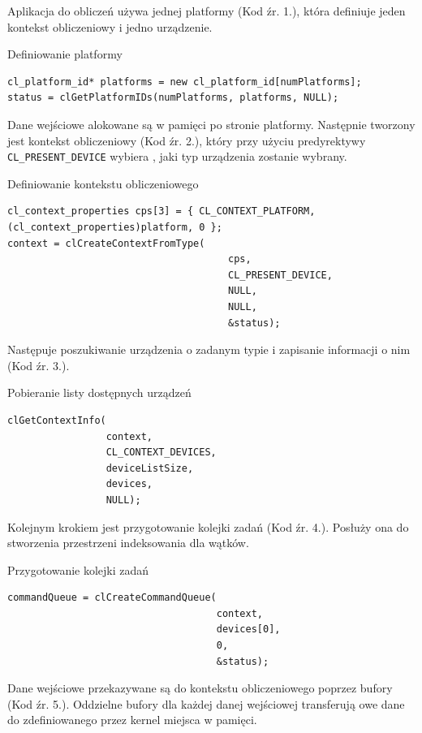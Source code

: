 Aplikacja do obliczeń używa jednej platformy (Kod źr. 1.), która definiuje jeden kontekst obliczeniowy i jedno urządzenie.
\begin{program}
\caption{Definiowanie platformy}
\begin{lstlisting}
cl_platform_id* platforms = new cl_platform_id[numPlatforms];
status = clGetPlatformIDs(numPlatforms, platforms, NULL);
\end{lstlisting}
\end{program}
Dane wejściowe alokowane są w pamięci po stronie platformy. Następnie tworzony jest kontekst obliczeniowy (Kod źr. 2.), który przy użyciu predyrektywy \verb|CL_PRESENT_DEVICE| wybiera , jaki typ urządzenia zostanie wybrany.
\begin{program}
\caption{Definiowanie kontekstu obliczeniowego}
\begin{lstlisting}
cl_context_properties cps[3] = { CL_CONTEXT_PLATFORM, (cl_context_properties)platform, 0 };
context = clCreateContextFromType(
                                      cps, 
                                      CL_PRESENT_DEVICE, 
                                      NULL, 
                                      NULL, 
                                      &status);
\end{lstlisting}
\end{program}
Następuje poszukiwanie urządzenia o zadanym typie i zapisanie informacji o nim (Kod źr. 3.).
\begin{program}
\caption{Pobieranie listy dostępnych urządzeń}
\begin{lstlisting}
clGetContextInfo(
                 context, 
                 CL_CONTEXT_DEVICES, 
                 deviceListSize, 
                 devices, 
                 NULL);

\end{lstlisting}
\end{program}
Kolejnym krokiem jest przygotowanie kolejki zadań (Kod źr. 4.). Posłuży ona do stworzenia przestrzeni indeksowania dla wątków.
\begin{program}
\caption{Przygotowanie kolejki zadań}
\begin{lstlisting}
commandQueue = clCreateCommandQueue(
                                    context, 
                                    devices[0], 
                                    0, 
                                    &status);
\end{lstlisting}
\end{program}
Dane wejściowe przekazywane są do kontekstu obliczeniowego poprzez bufory (Kod źr. 5.). Oddzielne bufory dla każdej danej wejściowej transferują owe  dane do zdefiniowanego przez kernel miejsca w pamięci. 
